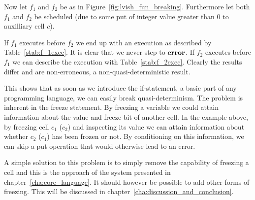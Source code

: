 Now let $f_1$ and $f_2$ be as in Figure~\ref{fig:lvish_fun_breaking}.
Furthermore let both $f_1$ and $f_2$ be scheduled (due to some put of integer
value greater than $0$ to auxilliary cell $c$).

If $f_1$ executes before $f_2$ we end up with an execution as described by
Table~\ref{stab:f_1exec}. It is clear that we never step to $\mbox{{\bf error}}$.
If $f_2$ executes before $f_1$ we can describe the execution with
Table~\ref{stab:f_2exec}. Clearly the results differ and are non-erroneous, a
non-quasi-deterministic result.

This shows that as soon as we introduce the if-statement, a basic part of any
programming language, we can easily break quasi-determinism. The problem is inherent
in the freeze statement. By freezing a variable we could attain information
about the value and freeze bit of another cell. In the example above, by
freezing cell $c_1$ ($c_2$) and inspecting its value we can attain information
about whether $c_2$ ($c_1$) has been frozen or not. By conditioning on this
information, we can skip a put operation that would otherwise lead to an error.

A simple solution to this problem is to simply remove the capability of freezing
a cell and this is the approach of the system presented in
chapter~\ref{cha:core_language}. It should however be possible to add other
forms of freezing. This will be discussed in
chapter~\ref{cha:discussion_and_conclusion}.

